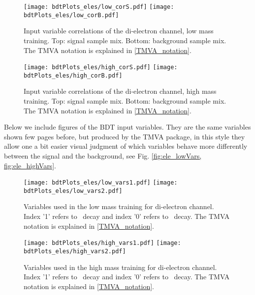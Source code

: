 \begin{small}
\begin{figure}[tbp]
  \begin{center}
   \texttt{[image: bdtPlots\_eles/low\_corS.pdf]}
   \texttt{[image: bdtPlots\_eles/low\_corB.pdf]}
    \caption[Input variable correlations of the di-electron channel, low mass training.]{ Input variable correlations of the di-electron channel, low mass training. Top: signal sample mix. Bottom: background sample mix. The TMVA notation is explained in \ref{TMVA_notation}.}
    \label{fig:ele_cors_low}
  \end{center}
\end{figure}

\begin{figure}[tbp]
  \begin{center}
   \texttt{[image: bdtPlots\_eles/high\_corS.pdf]}
   \texttt{[image: bdtPlots\_eles/high\_corB.pdf]}
    \caption[Input variable correlations of the di-electron channel, high mass training.]{ Input variable correlations of the di-electron channel, high mass training. Top: signal sample mix. Bottom: background sample mix. The TMVA notation is explained in \ref{TMVA_notation}.}
    \label{fig:ele_cors_high}
  \end{center}
\end{figure}
    
Below we include figures of the BDT input variables. They are the same variables shown few pages before, but produced by the TMVA package, in this style they allow one a bit easier visual judgment of which variables behave more differently between the signal and the background, see Fig. \ref{fig:ele_lowVars, fig:ele_highVars}.

\begin{figure}[H]
  \begin{center}
   \texttt{[image: bdtPlots\_eles/low\_vars1.pdf]}
   \texttt{[image: bdtPlots\_eles/low\_vars2.pdf]}
    \caption[Variables used in the low mass training for di-electron channel.]{ Variables used in the low mass training for di-electron channel. Index '1' refers to \HBB~decay and index '0' refers to \HZZ~decay. The TMVA notation is explained in \ref{TMVA_notation}.}
    \label{fig:ele_lowVars}
  \end{center}
\end{figure}

\begin{figure}[H]
  \begin{center}
   \texttt{[image: bdtPlots\_eles/high\_vars1.pdf]}
   \texttt{[image: bdtPlots\_eles/high\_vars2.pdf]}
    \caption[Variables used in the high mass training for di-electron channel.]{ Variables used in the high mass training for di-electron channel. Index '1' refers to \HBB~decay and index '0' refers to \HZZ~decay. The TMVA notation is explained in \ref{TMVA_notation}.}
    \label{fig:ele_highVars}
  \end{center}
\end{figure}


\end{small}
